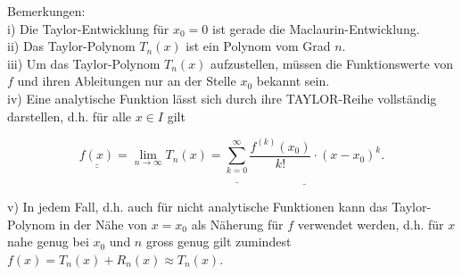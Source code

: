 \documentclass[10pt]{article}
\begin{document}
Bemerkungen:\\
i) Die Taylor-Entwicklung für $x_{0}=0$ ist gerade die Maclaurin-Entwicklung.\\
ii) Das Taylor-Polynom $T_{n}(x)$ ist ein Polynom vom Grad $n$.\\
iii) Um das Taylor-Polynom $T_{n}(x)$ aufzustellen, müssen die Funktionswerte von $f$ und ihren Ableitungen nur an der Stelle $x_{0}$ bekannt sein.\\
iv) Eine analytische Funktion lässt sich durch ihre TAYLOR-Reihe vollständig darstellen, d.h. für alle $x \in I$ gilt


\begin{equation*}
\underline{\underline{f(x)}}=\lim _{n \rightarrow \infty} T_{n}(x)=\underline{\underline{\sum_{k=0}^{\infty}} \frac{f^{(k)}\left(x_{0}\right)}{k!} \cdot\left(x-x_{0}\right)^{k} .} \tag{4.20}
\end{equation*}


v) In jedem Fall, d.h. auch für nicht analytische Funktionen kann das Taylor-Polynom in der Nähe von $x=x_{0}$ als Näherung für $f$ verwendet werden, d.h. für $x$ nahe genug bei $x_{0}$ und $n$ gross genug gilt zumindest\\
$f(x)=T_{n}(x)+R_{n}(x) \approx T_{n}(x)$.
\end{document}
